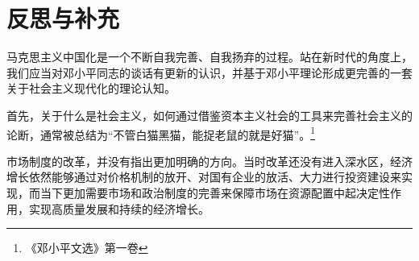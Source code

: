 \documentclass[12pt]{article}
\begin{document}
\section{反思与补充}
马克思主义中国化是一个不断自我完善、自我扬弃的过程。站在新时代的角度上，我们应当对邓小平同志的谈话有更新的认识，并基于邓小平理论形成更完善的一套关于社会主义现代化的理论认知。

首先，关于什么是社会主义，如何通过借鉴资本主义社会的工具来完善社会主义的论断，通常被总结为“不管白猫黑猫，能捉老鼠的就是好猫”。\footnote{《邓小平文选》第一卷}

市场制度的改革，并没有指出更加明确的方向。当时改革还没有进入深水区，经济增长依然能够通过对价格机制的放开、对国有企业的放活、大力进行投资建设来实现，而当下更加需要市场和政治制度的完善来保障市场在资源配置中起决定性作用，实现高质量发展和持续的经济增长。
\end{document}

